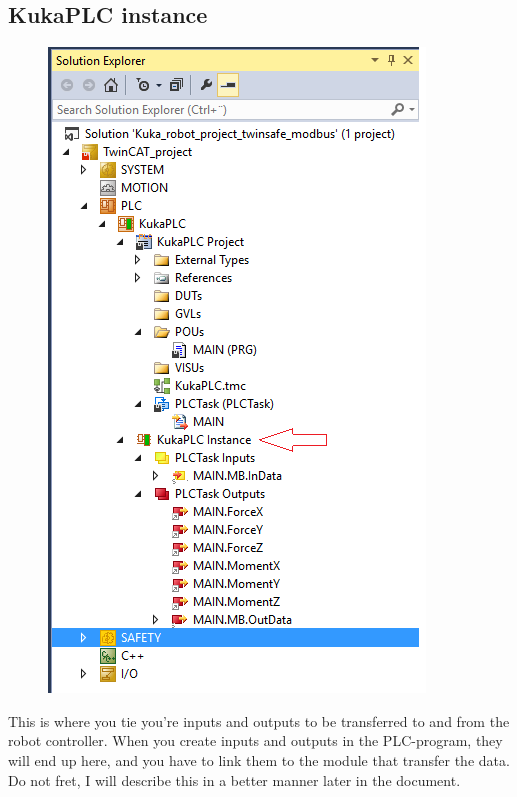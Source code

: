 \documentclass{article}
\begin{document}
\newpage

\subsection{KukaPLC instance}
\begin{figure}[!h]
    \centering
    \includegraphics[scale=0.7]{pictures/TC3_KukaPLC Instance.png}
    \caption{}
    \label{fig:my_label}
\end{figure}

This is where you tie you're inputs and outputs to be transferred to and from the robot controller. When you create inputs and outputs in the PLC-program, they will end up here, and you have to link them to the module that transfer the data. Do not fret, I will describe this in a better manner later in the document. 

\newpage
\end{document}

